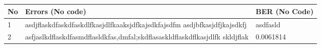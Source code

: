 \documentclass[a4paper,10pt]{article}
\title{}
\author{}
\begin{document}
\maketitle

\begin{abstract}

\end{abstract}

\section{}
 \begin{tabular}{| p{2cm} | p{2cm} | p{2cm} |}
 \hline
  No 	& Errors (No code)								& BER (No Code)			\\ \hline
  1  	& asdjflaskdfaskdfaskdlfkasjdlfkaaksjdfkajsdkfajsdfm asdjbfkasjdfjkajsdkfj	& asdfasld \\ \hline
  2	& asfjaslkdflaskdfasmdflasldkfas,dmfal;skdflasaskldflaskdflkasjdlfk skldjflak	& 0.0061814
 \end{tabular}
\end{document}
